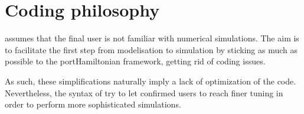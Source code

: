 \documentclass[letterpaper,10pt,english]{sphinxmanual}
\begin{document}
\section{Coding philosophy}
\label{\detokenize{index:coding-philosophy}}
\sphinxAtStartPar
{} assumes that the final user is not familiar with numerical simulations. The aim is to facilitate the first step from modelisation to simulation by sticking as much as possible to the port\sphinxhyphen{}Hamiltonian framework, getting rid of coding issues.

\sphinxAtStartPar
As such, these simplifications naturally imply a lack of optimization of the code. Nevertheless, the syntax of  try to let confirmed users to reach finer tuning in order to perform more sophisticated simulations.
\end{document}
